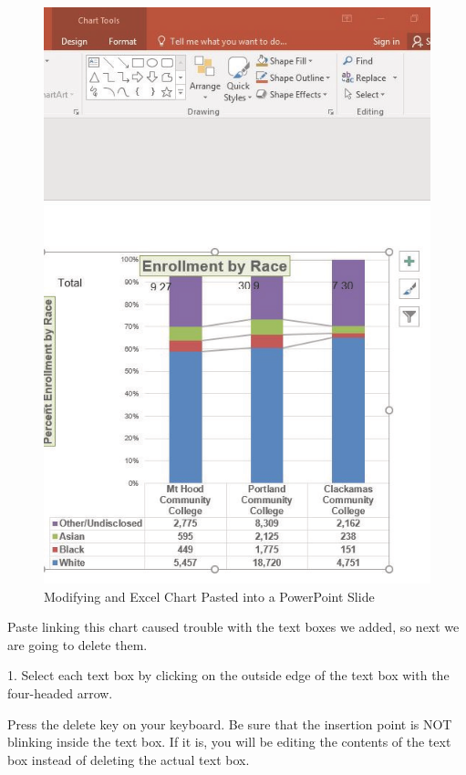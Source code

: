\begin{figure}[H]
	\centering
	\includegraphics[width=\maxwidth{.95\linewidth}]{gfx/ch04_fig49}
	\caption{Modifying and Excel Chart Pasted into a PowerPoint Slide}
	\label{04:fig49}
\end{figure}

Paste linking this chart caused trouble with the text boxes we added, so next we are going to delete
them.

1. Select each text box by clicking on the outside edge of the text box with the four-headed arrow.

Press the delete key on your keyboard. Be sure that the insertion point is NOT blinking inside
the text box. If it is, you will be editing the contents of the text box instead of deleting the actual
text box.

